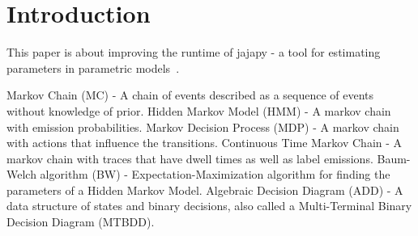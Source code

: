 \section{Introduction}\label{sec:introduction}
This paper is about improving the runtime of jajapy - a tool for estimating parameters in parametric models~\cite{goossens1993}.




Markov Chain (MC) - A chain of events described as a sequence of events without knowledge of prior.
Hidden Markov Model (HMM) - A markov chain with emission probabilities.
Markov Decision Process (MDP) - A markov chain with actions that influence the transitions.
Continuous Time Markov Chain - A markov chain with traces that have dwell times as well as label emissions.
Baum-Welch algorithm (BW) - Expectation-Maximization algorithm for finding the parameters of a Hidden Markov Model.
Algebraic Decision Diagram (ADD) - A data structure of states and binary decisions, also called a Multi-Terminal Binary Decision Diagram (MTBDD).


